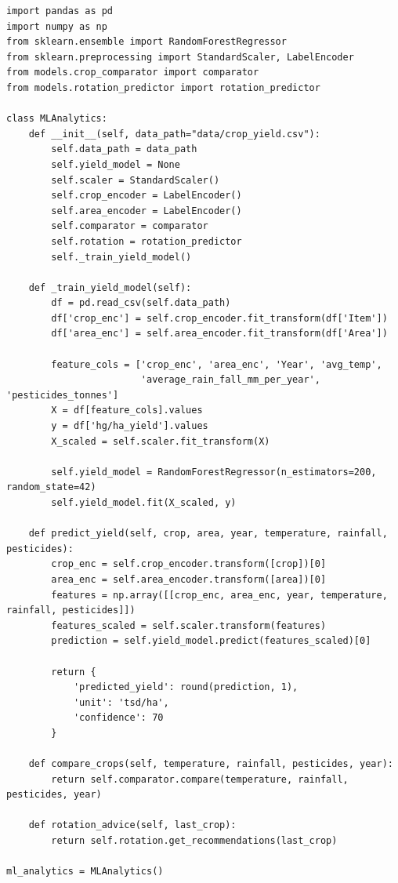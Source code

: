 \documentclass[14pt, a4paper]{extarticle}
\begin{document}
\begin{verbatim}
import pandas as pd
import numpy as np
from sklearn.ensemble import RandomForestRegressor
from sklearn.preprocessing import StandardScaler, LabelEncoder
from models.crop_comparator import comparator
from models.rotation_predictor import rotation_predictor

class MLAnalytics:
    def __init__(self, data_path="data/crop_yield.csv"):
        self.data_path = data_path
        self.yield_model = None
        self.scaler = StandardScaler()
        self.crop_encoder = LabelEncoder()
        self.area_encoder = LabelEncoder()
        self.comparator = comparator
        self.rotation = rotation_predictor
        self._train_yield_model()
    
    def _train_yield_model(self):
        df = pd.read_csv(self.data_path)
        df['crop_enc'] = self.crop_encoder.fit_transform(df['Item'])
        df['area_enc'] = self.area_encoder.fit_transform(df['Area'])
        
        feature_cols = ['crop_enc', 'area_enc', 'Year', 'avg_temp', 
                        'average_rain_fall_mm_per_year', 'pesticides_tonnes']
        X = df[feature_cols].values
        y = df['hg/ha_yield'].values
        X_scaled = self.scaler.fit_transform(X)
        
        self.yield_model = RandomForestRegressor(n_estimators=200, random_state=42)
        self.yield_model.fit(X_scaled, y)
    
    def predict_yield(self, crop, area, year, temperature, rainfall, pesticides):
        crop_enc = self.crop_encoder.transform([crop])[0]
        area_enc = self.area_encoder.transform([area])[0]
        features = np.array([[crop_enc, area_enc, year, temperature, rainfall, pesticides]])
        features_scaled = self.scaler.transform(features)
        prediction = self.yield_model.predict(features_scaled)[0]
        
        return {
            'predicted_yield': round(prediction, 1),
            'unit': 'tsd/ha',
            'confidence': 70
        }
    
    def compare_crops(self, temperature, rainfall, pesticides, year):
        return self.comparator.compare(temperature, rainfall, pesticides, year)
    
    def rotation_advice(self, last_crop):
        return self.rotation.get_recommendations(last_crop)

ml_analytics = MLAnalytics()
\end{verbatim}
\end{document}

